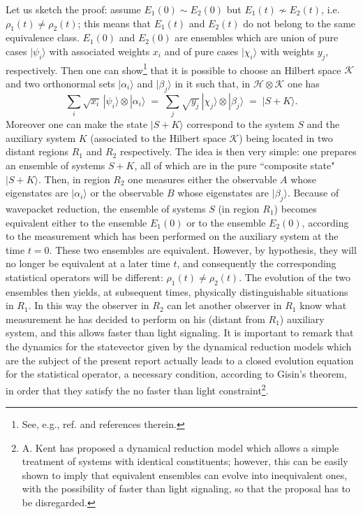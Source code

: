 \documentclass[10pt,a4paper]{article}
\begin{document}
Let us sketch the proof: assume $E_{1}(0) \sim E_{2}(0)$ but
$E_{1}(t) \not\sim E_{2}(t)$, i.e. $\rho_{1}(t) \neq \rho_{2}(t)$;
this means that $E_{1}(t)$ and $E_{2}(t)$ do not belong to the
same equivalence class. $E_{1}(0)$ and $E_{2}(0)$ are ensembles
which are union of pure cases $|\psi_{i}\rangle$ with associated
weights $x_{i}$ and of pure cases $|\chi_{i}\rangle$ with weights
$y_{j}$, respectively. Then one can show\footnote{See, e.g.,
ref.\cite{qph} and references therein.} that it is possible to choose an
Hilbert space
${\mathcal K}$ and two orthonormal sets
$|\alpha_{i}\rangle$ and $|\beta_{j}\rangle$ in it such that, in
${\mathcal H} \otimes {\mathcal K}$ one has
\begin{equation}
\sum_{i} \sqrt{x_{i}}\,|\psi_{i}\rangle\otimes|\alpha_{i}\rangle
\; = \; \sum_{j}
\sqrt{y_{j}}\,|\chi_{j}\rangle\otimes|\beta_{j}\rangle \; = \;
|S+K\rangle.
\end{equation}
Moreover one can make the state $|S+K\rangle$ correspond to the
system $S$ and the auxiliary system $K$ (associated to the Hilbert
space ${\mathcal K}$) being located in two distant regions $R_{1}$
and $R_{2}$ respectively. The idea is then very simple: one
prepares an ensemble of systems $S+K$, all of which are in the
pure ``composite state" $|S+K\rangle$. Then, in region $R_{2}$ one
measures either the observable $A$ whose eigenstates are
$|\alpha_{i}\rangle$ or the observable $B$ whose eigenstates are
$|\beta_{j}\rangle$. Because of wavepacket reduction, the ensemble
of systems $S$ (in region $R_{1}$) becomes equivalent either to
the ensemble $E_{1}(0)$ or to the ensemble $E_{2}(0)$, according
to the measurement which has been performed on the auxiliary
system at the time $t=0$. These two ensembles are equivalent.
However, by hypothesis, they will no longer  be  equivalent at a
later time $t$, and  consequently the corresponding statistical
operators will be different: $\rho_{1}(t) \neq \rho_{2}(t)$. The
evolution of the two ensembles then yields, at subsequent times,
physically distinguishable situations in $R_{1}$. In this way the
observer in $R_{2}$ can let another observer in $R_{1}$ know what
measurement he has decided to perform on his (distant from
$R_{1}$) auxiliary system, and this allows faster than light
signaling. It is important to remark that the dynamics for the
statevector given by the dynamical reduction models which are the
subject of the present report actually leads to a closed evolution
equation for the statistical operator, a necessary condition,
according to Gisin's theorem, in order that they satisfy the no
faster than light constraint\footnote{A. Kent \cite{kenfl} has
proposed a dynamical reduction model which allows a simple
treatment of systems with identical constituents; however, this
can be easily shown to imply that equivalent ensembles can evolve
into inequivalent ones, with the possibility of faster than light
signaling, so that the proposal has to be disregarded.}.
\end{document}
